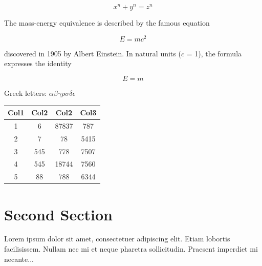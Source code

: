 \documentclass{article}
\begin{document}
\[ x^n + y^n = z^n \]

The mass-energy equivalence is described by the famous equation

\[E=mc^2\]

discovered in 1905 by Albert Einstein. 
In natural units ($c$ = 1), the formula expresses the identity

\begin{equation}
E=m
\end{equation}

Greek letters: \(\alpha \beta \gamma \rho \sigma \delta \epsilon \)

\begin{center}
\begin{tabular}{||c c c c||} 
\hline
Col1 & Col2 & Col2 & Col3 \\ [0.5ex] 
\hline\hline
1 & 6 & 87837 & 787 \\ 
\hline
2 & 7 & 78 & 5415 \\
\hline
3 & 545 & 778 & 7507 \\
\hline
4 & 545 & 18744 & 7560 \\
\hline
5 & 88 & 788 & 6344 \\ [1ex] 
\hline
\end{tabular}
\end{center}

\section{Second Section}
       
Lorem ipsum dolor sit amet, consectetuer adipiscing elit.  
Etiam lobortis facilisissem.  Nullam nec mi et neque pharetra 
sollicitudin.  Praesent imperdiet mi necante...

\listoffigures
\end{document}
